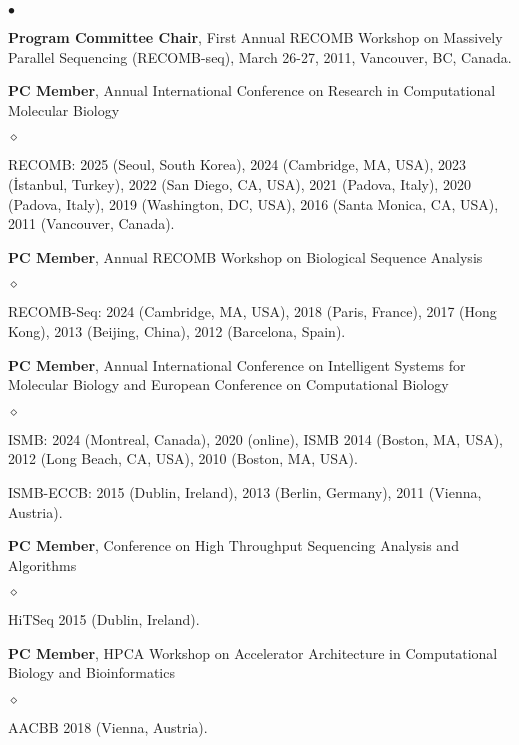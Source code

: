 \documentclass[margin,line]{res}
\newenvironment{list2}{
  \begin{list}{$\bullet$}{%
      \setlength{\itemsep}{0.1cm}
      \setlength{\parsep}{0in} \setlength{\parskip}{0in}
      \setlength{\topsep}{0in} \setlength{\partopsep}{0in} 
      \setlength{\leftmargin}{0.2in}}}{\end{list}}
\newenvironment{list3}{
  \begin{list}{$\diamond$}{%
      \setlength{\itemsep}{0in}
      \setlength{\parsep}{0.1cm} \setlength{\parskip}{0.1cm}
      \setlength{\topsep}{0.1cm} \setlength{\partopsep}{0.1cm} 
      \setlength{\leftmargin}{0.2in}}}{\end{list}}
\begin{document}
\begin{resume}
\begin{list2}
    \item
        \textbf{Program Committee Chair}, First Annual RECOMB Workshop on Massively Parallel Sequencing (RECOMB-seq), March 26-27, 2011, Vancouver, BC, Canada.      

\clearpage

    \item
        \textbf{PC Member}, Annual International Conference on Research in Computational Molecular Biology
        \begin{list3}
            \item RECOMB: 2025 (Seoul, South Korea), 2024 (Cambridge, MA, USA), 2023 (İstanbul, Turkey), 2022 (San Diego, CA, USA),
            2021 (Padova, Italy), 2020 (Padova, Italy),  2019 (Washington, DC, USA),   2016 (Santa Monica, CA, USA),  2011 (Vancouver, Canada).
        \end{list3}
      
    \item 
        \textbf{PC Member},  Annual RECOMB Workshop on Biological Sequence Analysis        
        \begin{list3}
            \item RECOMB-Seq: 2024 (Cambridge, MA, USA), 2018 (Paris, France),  2017 (Hong Kong), 2013 (Beijing, China),  2012 (Barcelona, Spain).
        \end{list3}
    
    \item
        \textbf{PC Member}, Annual International Conference on Intelligent Systems for Molecular Biology and  European Conference on  Computational Biology  
        \begin{list3}
            \item ISMB: 2024 (Montreal, Canada), 2020 (online), ISMB 2014 (Boston, MA, USA), 2012 (Long Beach, CA, USA),  2010 (Boston, MA, USA).
            \item ISMB-ECCB: 2015 (Dublin, Ireland), 2013 (Berlin, Germany), 2011 (Vienna, Austria).
        \end{list3}
    
    \item
        \textbf{PC Member}, Conference on High Throughput Sequencing Analysis and Algorithms 
        \begin{list3}
            \item HiTSeq 2015 (Dublin, Ireland).
        \end{list3}
    
    \item
        \textbf{PC Member}, 
        HPCA Workshop on Accelerator Architecture in Computational Biology and Bioinformatics 
        \begin{list3}
            \item AACBB 2018 (Vienna, Austria).
        \end{list3}
    

\end{list2}
\end{resume}
\end{document}
